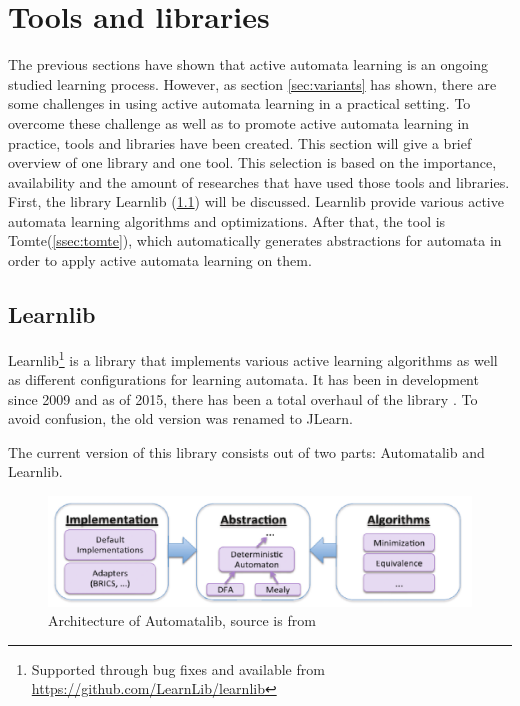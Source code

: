 \documentclass[multi,crop=false,class=article]{standalone}
\begin{document}
\section{Tools and libraries}
\label{sec:tools}
The previous sections have shown that active automata learning is an ongoing  
studied learning process. However, as section \ref{sec:variants} has shown, 
there are some challenges in using active automata learning in a practical 
setting. To overcome these challenge as well as to promote active automata 
learning in practice, tools and libraries have been created. This section will 
give a brief overview of one library and one tool. This selection is based on 
the importance, availability and the amount of researches that have used those 
tools and libraries. First, the library Learnlib (\ref{ssec:learnlib}) will be 
discussed. Learnlib provide various active automata learning algorithms and 
optimizations. After that, the tool is Tomte(\ref{ssec:tomte}), which 
automatically generates abstractions for automata in order to apply active 
automata learning on them. 

\subsection{Learnlib}
\label{ssec:learnlib}

Learnlib\footnote{Supported through bug fixes and available from
\url{https://github.com/LearnLib/learnlib}} is a library that implements various
active learning algorithms as well as different configurations for learning
automata. It has been in development since 2009 \cite{Raffelt2009} and as of
2015, there has been a total overhaul of the library \cite{Isberner2015b}. To 
avoid confusion, the old version was renamed to JLearn.

The current version of this library consists out of two parts: Automatalib and
Learnlib.

\begin{figure}[!ht]
	\includegraphics[width=\textwidth]{Tool_images/automatalib_architecture.png}
	\caption{Architecture of Automatalib, source is from \cite{Isberner2015b}}
	\label{fig:automatalib_arch}
\end{figure}
\end{document}

